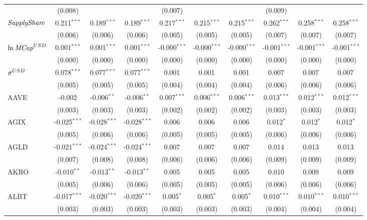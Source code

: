 \begin{table}[!htbp]
\begin{tabular}{@{\extracolsep{5pt}}lccccccccc}
  & (0.008) & & & (0.007) & & & (0.009) & & \\
 ${\it SupplyShare}$ & 0.211$^{***}$ & 0.189$^{***}$ & 0.189$^{***}$ & 0.217$^{***}$ & 0.215$^{***}$ & 0.215$^{***}$ & 0.262$^{***}$ & 0.258$^{***}$ & 0.258$^{***}$ \\
  & (0.006) & (0.006) & (0.006) & (0.005) & (0.005) & (0.005) & (0.007) & (0.007) & (0.007) \\
 ${\it \ln MCap}^{USD}$ & 0.001$^{***}$ & 0.001$^{***}$ & 0.001$^{***}$ & -0.000$^{***}$ & -0.000$^{***}$ & -0.000$^{***}$ & -0.001$^{***}$ & -0.001$^{***}$ & -0.001$^{***}$ \\
  & (0.000) & (0.000) & (0.000) & (0.000) & (0.000) & (0.000) & (0.000) & (0.000) & (0.000) \\
 ${\it \sigma}^{USD}$ & 0.078$^{***}$ & 0.077$^{***}$ & 0.077$^{***}$ & 0.001$^{}$ & 0.001$^{}$ & 0.001$^{}$ & 0.007$^{}$ & 0.007$^{}$ & 0.007$^{}$ \\
  & (0.005) & (0.005) & (0.005) & (0.004) & (0.004) & (0.004) & (0.006) & (0.006) & (0.006) \\
 AAVE & -0.002$^{}$ & -0.006$^{**}$ & -0.006$^{**}$ & 0.007$^{***}$ & 0.006$^{***}$ & 0.006$^{***}$ & 0.013$^{***}$ & 0.012$^{***}$ & 0.012$^{***}$ \\
  & (0.003) & (0.003) & (0.003) & (0.002) & (0.002) & (0.002) & (0.003) & (0.003) & (0.003) \\
 AGIX & -0.025$^{***}$ & -0.028$^{***}$ & -0.028$^{***}$ & 0.006$^{}$ & 0.006$^{}$ & 0.006$^{}$ & 0.012$^{*}$ & 0.012$^{*}$ & 0.012$^{*}$ \\
  & (0.005) & (0.006) & (0.006) & (0.005) & (0.005) & (0.005) & (0.006) & (0.006) & (0.006) \\
 AGLD & -0.021$^{***}$ & -0.024$^{***}$ & -0.024$^{***}$ & 0.007$^{}$ & 0.007$^{}$ & 0.007$^{}$ & 0.014$^{}$ & 0.013$^{}$ & 0.013$^{}$ \\
  & (0.007) & (0.008) & (0.008) & (0.006) & (0.006) & (0.006) & (0.009) & (0.009) & (0.009) \\
 AKRO & -0.010$^{**}$ & -0.013$^{**}$ & -0.013$^{**}$ & 0.005$^{}$ & 0.005$^{}$ & 0.005$^{}$ & 0.010$^{}$ & 0.009$^{}$ & 0.009$^{}$ \\
  & (0.005) & (0.006) & (0.006) & (0.005) & (0.005) & (0.005) & (0.006) & (0.006) & (0.006) \\
 ALBT & -0.017$^{***}$ & -0.020$^{***}$ & -0.020$^{***}$ & 0.005$^{*}$ & 0.005$^{*}$ & 0.005$^{*}$ & 0.010$^{***}$ & 0.010$^{***}$ & 0.010$^{***}$ \\
  & (0.003) & (0.003) & (0.003) & (0.003) & (0.003) & (0.003) & (0.004) & (0.004) & (0.004) \\

\end{tabular}
\end{table}
